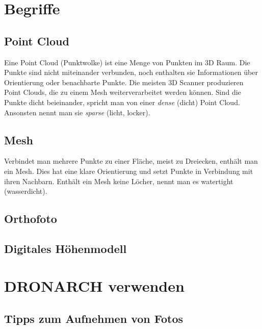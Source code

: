 \chapter{Begriffe}
		\section{Point Cloud}\label{app:point_cloud}
		Eine Point Cloud (Punktwolke) ist eine Menge von Punkten im 3D Raum. Die Punkte sind nicht miteinander verbunden, noch enthalten sie Informationen über Orientierung oder benachbarte Punkte. Die meisten 3D Scanner produzieren Point Clouds, die zu einem Mesh weiterverarbeitet werden können.
		Sind die Punkte dicht beieinander, spricht man von einer \emph{dense} (dicht) Point Cloud. Ansonsten nennt man sie \emph{sparse} (licht, locker).
		
		\section{Mesh}\label{app:mesh}
		Verbindet man mehrere Punkte zu einer Fläche, meist zu Dreiecken, enthält man ein Mesh. Dies hat eine klare Orientierung und setzt Punkte in Verbindung mit ihren Nachbarn. Enthält ein Mesh keine Löcher, nennt man es watertight (wasserdicht).
		
		\section{Orthofoto} \label{app:orthofoto}
		
		\section{Digitales Höhenmodell} \label{app:dtm}

\chapter{DRONARCH verwenden}
	\section{Tipps zum Aufnehmen von Fotos}\label{app:tip_foto}